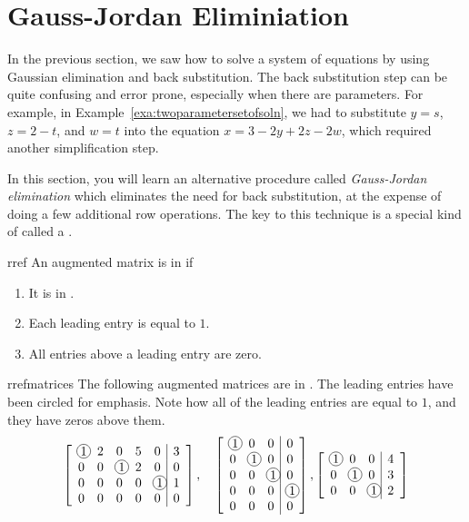\section{Gauss-Jordan Eliminiation}

In the previous section, we saw how to solve a system of equations by
using Gaussian elimination and back substitution. The back
substitution step can be quite confusing and error prone, especially
when there are parameters. For example, in
Example~\ref{exa:twoparametersetofsoln}, we had to substitute $y=s$,
$z=2-t$, and $w=t$ into the equation $x=3-2y+2z-2w$, which required
another simplification step.

In this section, you will learn an alternative procedure called {\em
  Gauss-Jordan elimination} which eliminates the need for back
substitution, at the expense of doing a few additional row operations.
The key to this technique is a special kind of {\ef} called a
{\em {\rref}}.

\begin{definition}{\RREF}{rref}
  An augmented matrix is in \textbf{\rref}\eindex{\rref} if
  
  \begin{enumerate}
  \item It is in {\ef}.
    
  \item Each leading entry is equal to $1$.
    
  \item All entries above a leading entry are zero.
  \end{enumerate}
\end{definition}

\begin{example}{{\RREF}}{rrefmatrices}
The following augmented matrices are in {\rref}. The leading entries
have been circled for emphasis. Note how all of the leading entries
are equal to $1$, and they have zeros above them.
\begin{equation*}
\leftB
\begin{array}{rrrrr|r}
\circled{1} & 2 & 0 & 5 & 0 & 3 \\
0 & 0 & \circled{1} & 2 & 0 & 0 \\
0 & 0 & 0 & 0 & \circled{1} & 1 \\
0 & 0 & 0 & 0 & 0 & 0
\end{array}
\rightB,\quad\leftB
\begin{array}{rrr|r}
\circled{1} & 0 & 0 & 0 \\
0 & \circled{1} & 0 & 0 \\
0 & 0 & \circled{1} & 0 \\
0 & 0 & 0 & \circled{1} \\
0 & 0 & 0 & 0
\end{array}
\rightB , \leftB
\begin{array}{rrr|r}
\circled{1} & 0 & 0 & 4 \\
0 & \circled{1} & 0 & 3 \\
0 & 0 & \circled{1} & 2 
\end{array}
\rightB
\end{equation*}
\end{example}

